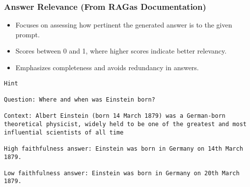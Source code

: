 \begin{frame}[fragile]\frametitle{Answer Relevance (From RAGas Documentation)}

\begin{itemize}
\item Focuses on assessing how pertinent the generated answer is to the given prompt.
\item Scores between 0 and 1, where higher scores indicate better relevancy.
\item Emphasizes completeness and avoids redundancy in answers.
\end{itemize}
  
\begin{lstlisting}
Hint

Question: Where and when was Einstein born?

Context: Albert Einstein (born 14 March 1879) was a German-born theoretical physicist, widely held to be one of the greatest and most influential scientists of all time

High faithfulness answer: Einstein was born in Germany on 14th March 1879.

Low faithfulness answer: Einstein was born in Germany on 20th March 1879.
\end{lstlisting}  
\end{frame}

